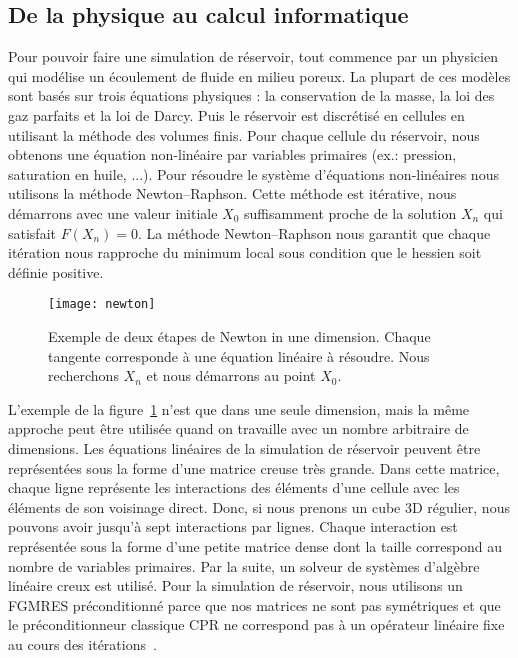 \subsection{De la physique au calcul informatique}
Pour pouvoir faire une simulation de réservoir, tout commence par un physicien qui modélise un écoulement de fluide en milieu poreux.
%
La plupart de ces modèles sont basés sur trois équations physiques : la conservation de la masse, la loi des gaz parfaits et la loi de Darcy.
%
Puis le réservoir est discrétisé en cellules en utilisant la méthode des volumes finis.
%
Pour chaque cellule du réservoir, nous obtenons une équation non-linéaire par variables primaires (ex.: pression, saturation en huile, ...).
%
Pour résoudre le système d'équations non-linéaires nous utilisons la méthode Newton–Raphson.
%
Cette méthode est itérative, nous démarrons avec une valeur initiale $X_0$ suffisamment proche de la solution $X_n$ qui satisfait $F(X_n) = 0$.
%
La méthode Newton–Raphson nous garantit que chaque itération nous rapproche du minimum local sous condition que le hessien soit définie positive.

\begin{figure}[!h]
  \centering
  \texttt{[image: newton]}
  \caption{Exemple de deux étapes de Newton in une dimension.
    Chaque tangente corresponde à une équation linéaire à résoudre.
    Nous recherchons $X_n$ et nous démarrons au point $X_0$.}
\label{fig:newton}
\end{figure}

L'exemple de la figure~\ref{fig:newton} n'est que dans une seule dimension, mais la même approche peut être utilisée quand on travaille avec un nombre arbitraire de dimensions.
%
Les équations linéaires de la simulation de réservoir peuvent être représentées sous la forme d'une matrice creuse très grande.
%
Dans cette matrice, chaque ligne représente les interactions des éléments d'une cellule avec les éléments de son voisinage direct.
%
Donc, si nous prenons un cube 3D régulier, nous pouvons avoir jusqu'à sept interactions par lignes.
%
Chaque interaction est représentée sous la forme d'une petite matrice dense dont la taille correspond au nombre de variables primaires.
%
Par la suite, un solveur de systèmes d'algèbre linéaire creux est utilisé.
%
Pour la simulation de réservoir, nous utilisons un FGMRES préconditionné parce que nos matrices ne sont pas symétriques et que le préconditionneur classique CPR ne correspond pas à un opérateur linéaire fixe au cours des itérations~\cite{cao2005parallel}.
